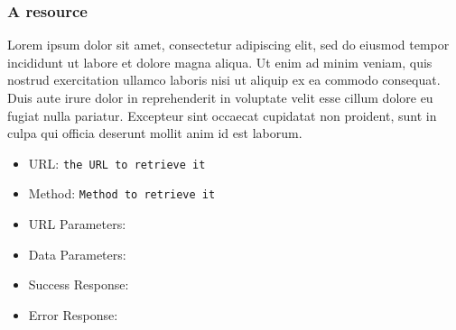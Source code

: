 \subsubsection*{A resource}


Lorem ipsum dolor sit amet, consectetur adipiscing elit, sed do eiusmod tempor incididunt ut labore et dolore magna aliqua. Ut enim ad minim veniam, quis nostrud exercitation ullamco laboris nisi ut aliquip ex ea commodo consequat. Duis aute irure dolor in reprehenderit in voluptate velit esse cillum dolore eu fugiat nulla pariatur. Excepteur sint occaecat cupidatat non proident, sunt in culpa qui officia deserunt mollit anim id est laborum.


\begin{itemize}
    \item URL: \texttt{the URL to retrieve it}
    \item Method: \texttt{Method to retrieve it}
    \item URL Parameters:
    \item Data Parameters: 
    \item Success Response:
    \item Error Response:
    
\end{itemize}

